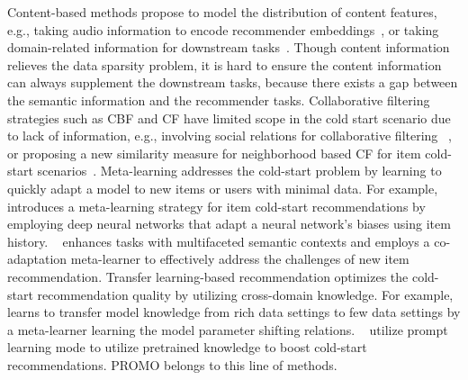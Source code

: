 \documentclass[sigconf]{acmart}
\newcommand{\sys}{\textsc{PROMO}\xspace}
\begin{document}
Content-based methods propose to model the distribution of content features, e.g., taking audio information to encode recommender embeddings~\cite{van2013deep,bogdanov2013semantic,chen2021learning}, or taking domain-related information for downstream tasks~\cite{alam2018domain,alam2021corporate,deldjoo2018content,chen2023win}. 
Though content information relieves the data sparsity problem, it is hard to ensure the content information can always supplement the downstream tasks, because there exists a gap between the semantic information and the recommender tasks. 
Collaborative filtering strategies such as CBF and CF have limited scope in the cold start scenario due to lack of information, e.g., involving social relations for collaborative filtering 
~\cite{sedhain2014social,ijcai2021p197}, or proposing a new similarity measure for neighborhood based CF for item cold-start scenarios~\cite{wei2017collaborative}.
Meta-learning addresses the cold-start problem by learning to quickly adapt a model to new items or users with minimal data.
For example,~\cite{zhu2021learning} introduces a meta-learning strategy for item cold-start recommendations by employing deep neural networks that adapt a neural network's biases using item history.
~\cite{lu2020meta} enhances tasks with multifaceted semantic contexts and employs a co-adaptation meta-learner to effectively address the challenges of new item recommendation.
Transfer learning-based recommendation optimizes the cold-start recommendation quality by utilizing cross-domain knowledge. 
For example,~\cite{zhang2021model} learns to transfer model knowledge from rich data settings to few data settings by a meta-learner learning the model parameter shifting relations. 
~\cite{wu2024personalized} utilize prompt learning mode to utilize pretrained knowledge to boost cold-start recommendations. 
\sys belongs to this line of methods. 
\end{document}
